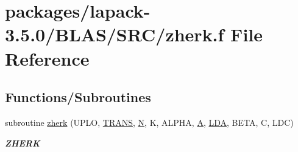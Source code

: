\hypertarget{lapack-3_85_80_2BLAS_2SRC_2zherk_8f}{}\section{packages/lapack-\/3.5.0/\+B\+L\+A\+S/\+S\+R\+C/zherk.f File Reference}
\label{lapack-3_85_80_2BLAS_2SRC_2zherk_8f}
\subsection*{Functions/\+Subroutines}
\begin{DoxyCompactItemize}
\item 
subroutine \hyperlink{group__complex16__blas__level3_ga71e68893445a523b923411ebf4c22582}{zherk} (U\+P\+L\+O, \hyperlink{superlu__enum__consts_8h_a0c4e17b2d5cea33f9991ccc6a6678d62a1f61e3015bfe0f0c2c3fda4c5a0cdf58}{T\+R\+A\+N\+S}, \hyperlink{polmisc_8c_a0240ac851181b84ac374872dc5434ee4}{N}, K, A\+L\+P\+H\+A, \hyperlink{classA}{A}, \hyperlink{example__user_8c_ae946da542ce0db94dced19b2ecefd1aa}{L\+D\+A}, B\+E\+T\+A, C, L\+D\+C)
\begin{DoxyCompactList}\small\item\em {\bfseries Z\+H\+E\+R\+K} \end{DoxyCompactList}\end{DoxyCompactItemize}
